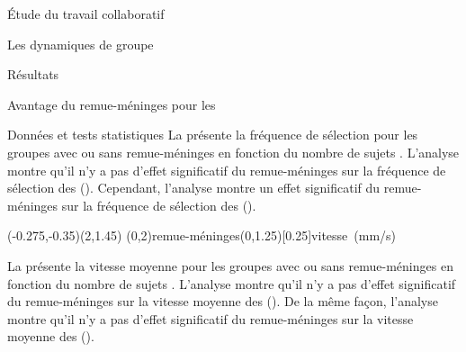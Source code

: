 \documentclass[myfrancais]{mythesis}
\begin{document}
\begin{mypart}{Étude du travail collaboratif}
\begin{mychapter}{Les dynamiques de groupe}
\begin{mysection}{Résultats}
\begin{mysubsection}{Avantage du remue-méninges pour les }
\begin{mysubsubsection}{Données et tests statistiques}
						La  présente la fréquence de sélection  pour les groupes avec ou sans remue-méninges  en fonction du nombre de sujets .
						L'analyse montre qu'il n'y a pas d'effet significatif du remue-méninges  sur la fréquence de sélection  des  ().
						Cependant, l'analyse montre un effet significatif du remue-méninges  sur la fréquence de sélection  des  ().

						\begin{myfigure}
							\begin{myps}(-0.275,-0.35)(2,1.45)
								\myaxes(0,2){remue-méninges}(0,1.25)[0.25]{vitesse~(mm/s)}
							\end{myps}
						\end{myfigure}

						La  présente la vitesse moyenne  pour les groupes avec ou sans remue-méninges  en fonction du nombre de sujets .
						L'analyse montre qu'il n'y a pas d'effet significatif du remue-méninges  sur la vitesse moyenne  des  ().
						De la même façon, l'analyse montre qu'il n'y a pas d'effet significatif du remue-méninges  sur la vitesse moyenne  des  ().


\end{mysubsubsection}
\end{mysubsection}
\end{mysection}
\end{mychapter}
\end{mypart}
\end{document}

